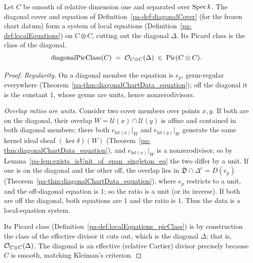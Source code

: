\begin{theorem}
  \label{pa-thm:diagonalLocalEquations}
  \leanok

  Let \(C\) be smooth of relative dimension one and separated over \(\operatorname{Spec} k\). The diagonal cover
  and equation of Definition~\ref{pa-def:diagonalCover} (for the frozen chart datum) form a system of
  local equations (Definition~\ref{pa-def:localEquations}) on \(C \otimes C\), cutting out the
  diagonal \(\Delta\). Its Picard class is the class of the diagonal,
  \[
    \mathrm{diagonalPicClass}(C) \;=\; \mathcal{O}_{C \otimes C}(\Delta) \;\in\; \operatorname{Pic}(C \otimes C).
  \]
\end{theorem}
\begin{proof}
  \leanok
  \emph{Regularity.} On a diagonal member the equation is \(e_p\), germ-regular everywhere
  (Theorem~\ref{pa-thm:diagonalChartData_equation}); off the diagonal it is the constant \(1\), whose
  germs are units, hence nonzerodivisors.

  \emph{Overlap ratios are units.} Consider two cover members over points \(x, y\). If both are on
  the diagonal, their overlap \(W = \mathcal U(x) \cap \mathcal U(y)\) is affine and contained in
  both diagonal members; there both \(e_{\mathrm{fst}(x)}|_W\) and \(e_{\mathrm{fst}(y)}|_W\)
  generate the same kernel ideal sheaf \((\ker \delta)(W)\)
  (Theorem~\ref{pa-thm:diagonalChartData_equation}), and \(e_{\mathrm{fst}(x)}|_W\) is a nonzerodivisor,
  so by Lemma~\ref{pa-lem:exists_isUnit_of_span_singleton_eq} the two differ by a unit. If one is on
  the diagonal and the other off, the overlap lies in \(\mathfrak D \cap \Delta^{\mathrm c} =
  D(e_p)\) (Theorem~\ref{pa-thm:diagonalChartData_equation}), where \(e_p\) restricts to a unit, and
  the off-diagonal equation is \(1\); so the ratio is a unit (or its inverse). If both are off the
  diagonal, both equations are \(1\) and the ratio is \(1\). Thus the data is a local-equation
  system.

  Its Picard class (Definition~\ref{pa-def:localEquations_picClass}) is by construction the class of
  the effective divisor it cuts out, which is the diagonal \(\Delta\); that is, \(\mathcal{O}_{C \otimes
  C}(\Delta)\). The diagonal is an effective (relative Cartier) divisor precisely because \(C\) is
  smooth, matching Kleiman's criterion.
\end{proof}

